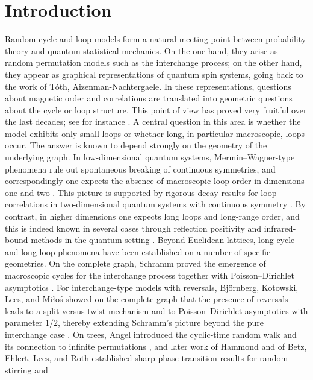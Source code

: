\documentclass[11pt]{article}
\theoremstyle{remark}
\theoremstyle{plain}
\newcommand{\1}{\mathbbm{1}}
\begin{document}
\section{Introduction}
Random cycle and loop models form a natural meeting point between probability theory and
quantum statistical mechanics. On the one hand, they arise as random permutation models such
as the interchange process; on the other hand, they appear as graphical representations of
quantum spin systems, going back to the work of T\'oth, Aizenman-Nachtergaele. In these
representations, questions about magnetic order and correlations are translated into geometric
questions about the cycle or loop structure. This point of view has proved very fruitful over
the last decades; see for instance \cite{Toth1993,AizenmanNachtergaele1994,
GoldschmidtUeltschiWindridge2011,Ueltschi2013}.
A central question in this area is whether the model exhibits only small loops or whether long,
in particular macroscopic, loops occur. The answer is known to depend strongly on the geometry
of the underlying graph. In low-dimensional quantum systems, Mermin--Wagner-type phenomena
rule out spontaneous breaking of continuous symmetries, and correspondingly one expects the
absence of macroscopic loop order in dimensions one and two \cite{MerminWagner1966}. This
picture is supported by rigorous decay results for loop correlations in two-dimensional quantum
systems with continuous symmetry \cite{BenassiFrohlichUeltschi2017}. By contrast, in higher
dimensions one expects long loops and long-range order, and this is indeed known in several
cases through reflection positivity and infrared-bound methods in the quantum setting
\cite{Ueltschi2013,bjornberg2022reflection,betz2026improved}.
Beyond Euclidean lattices, long-cycle and long-loop phenomena have been established on a number
of specific geometries. On the complete graph, Schramm proved the emergence of macroscopic
cycles for the interchange process together with Poisson--Dirichlet asymptotics
\cite{Schramm2005}. For interchange-type models with reversals, Bj\"ornberg, Kotowski, Lees,
and Mi{\l}o{\'s} showed on the complete graph that the presence of reversals leads to a
split-versus-twist mechanism and to Poisson--Dirichlet asymptotics with parameter \(1/2\),
thereby extending Schramm's picture beyond the pure interchange case
\cite{BjornbergKotowskiLeesMilos2019}. On trees, Angel introduced the cyclic-time random walk
and its connection to infinite permutations \cite{Angel2003}, and later work of Hammond and of
Betz, Ehlert, Lees, and Roth established sharp phase-transition results for random stirring and
\end{document}
